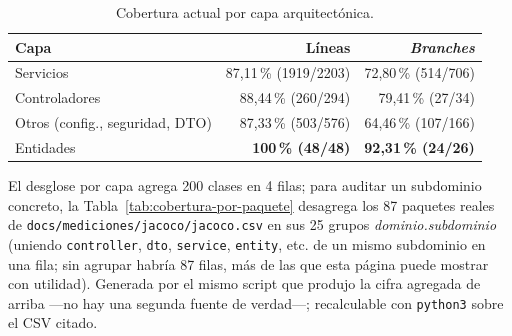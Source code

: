 \documentclass[11pt,a4paper]{article}
\newcommand{\ruta}[1]{\texttt{\footnotesize #1}}
\begin{document}
\begin{table}[htbp]
\centering
\caption{Cobertura actual por capa arquitectónica.}
\label{tab:cobertura-por-capa}
\begin{tabular}{@{}lrr@{}}
\toprule
\textbf{Capa} & \textbf{Líneas} & \textbf{\emph{Branches}} \\
\midrule
Servicios & 87,11\,\% (1919/2203) & 72,80\,\% (514/706) \\
Controladores & 88,44\,\% (260/294) & 79,41\,\% (27/34) \\
Otros (config., seguridad, DTO) & 87,33\,\% (503/576) & 64,46\,\% (107/166) \\
Entidades & \textbf{100\,\% (48/48)} & \textbf{92,31\,\% (24/26)} \\
\bottomrule
\end{tabular}
\end{table}

El desglose por capa agrega 200 clases en 4 filas; para auditar un
subdominio concreto, la Tabla~\ref{tab:cobertura-por-paquete} desagrega
los 87 paquetes reales de \ruta{docs/mediciones/jacoco/jacoco.csv} en
sus 25 grupos \emph{dominio.subdominio} (uniendo \texttt{controller},
\texttt{dto}, \texttt{service}, \texttt{entity}, etc. de un mismo
subdominio en una fila; sin agrupar habría 87 filas, más de las que esta
página puede mostrar con utilidad). Generada por el mismo script que
produjo la cifra agregada de arriba —no hay una segunda fuente de
verdad—; recalculable con \texttt{python3} sobre el CSV citado.
\end{document}
